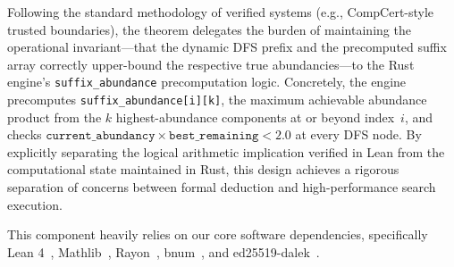 Following the standard methodology of verified systems (e.g., CompCert-style
trusted boundaries), the theorem delegates the burden of maintaining
the operational invariant---that the dynamic DFS prefix and the precomputed suffix array
correctly upper-bound the respective true abundancies---to the Rust engine's
\texttt{suffix\_abundance} precomputation logic.  Concretely, the engine
precomputes \texttt{suffix\_abundance[i][k]}, the maximum achievable abundance
product from the $k$ highest-abundance components at or beyond index~$i$,
and checks $\texttt{current\_abundancy} \times \texttt{best\_remaining} < 2.0$
at every DFS node.  By explicitly separating the logical arithmetic implication
verified in Lean from the computational state maintained in Rust, this design
achieves a rigorous separation of concerns between
formal deduction and high-performance search execution.


This component heavily relies on our core software dependencies, specifically Lean 4~\cite{moura2021}, Mathlib~\cite{mathlib2020}, Rayon~\cite{rayon2024}, bnum~\cite{bnum2024}, and ed25519-dalek~\cite{ed25519dalek2024}.
